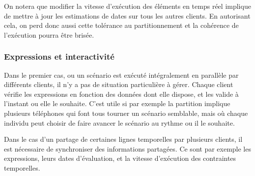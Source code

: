 \documentclass{article}
\begin{document}
On notera que modifier la vitesse d'exécution des éléments en temps réel implique de mettre à jour les estimations de dates sur tous les autres clients. 
En autorisant cela, on perd donc aussi cette tolérance au partitionnement et la cohérence de l'exécution pourra être brisée.

\begin{figure}[h]
	\centering
	\begin{tikzpicture}
	
	\end{tikzpicture}
	\label{scenar.non-interactif}
\end{figure}


\subsubsection{Expressions et interactivité}
\label{section.expr-interact}
Dans le premier cas, ou un scénario est exécuté intégralement en parallèle par différents clients, il n'y a pas de situation particulière à gérer.
Chaque client vérifie les expressions en fonction des données dont elle dispose, et les valide à l'instant ou elle le souhaite. 
C'est utile si par exemple la partition implique plusieurs téléphones qui font tous tourner un scénario semblable, mais où chaque individu peut choisir de faire avancer le scénario au rythme ou il le souhaite.

Dans le cas d'un partage de certaines lignes temporelles par plusieurs clients, il est nécessaire de synchroniser des informations partagées.
Ce sont par exemple les expressions, leurs dates d'évaluation, et la vitesse d'exécution des contraintes temporelles.
\end{document}
